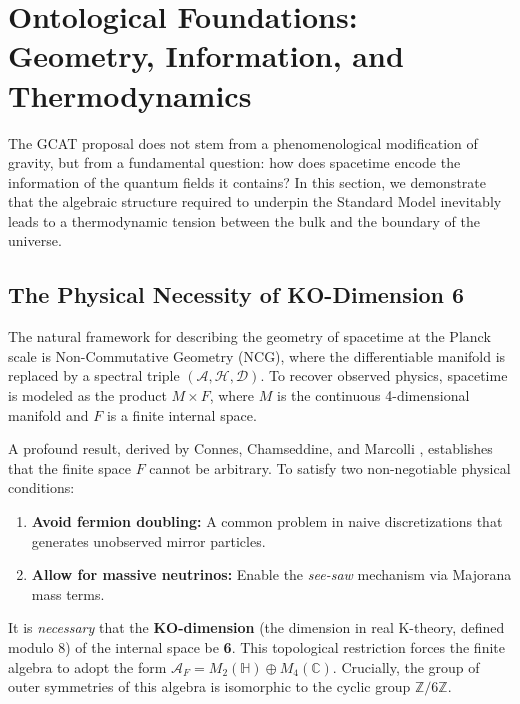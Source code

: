 \documentclass[12pt, a4paper]{article}
\theoremstyle{plain}
\theoremstyle{definition}
\begin{document}
\section{Ontological Foundations: Geometry, Information, and Thermodynamics}
\label{sec:foundations}

The GCAT proposal does not stem from a phenomenological modification of gravity, but from a fundamental question: how does spacetime encode the information of the quantum fields it contains? In this section, we demonstrate that the algebraic structure required to underpin the Standard Model inevitably leads to a thermodynamic tension between the bulk and the boundary of the universe.

\subsection{The Physical Necessity of KO-Dimension 6}

The natural framework for describing the geometry of spacetime at the Planck scale is Non-Commutative Geometry (NCG), where the differentiable manifold is replaced by a spectral triple $(\mathcal{A}, \mathcal{H}, \mathcal{D})$. To recover observed physics, spacetime is modeled as the product $M \times F$, where $M$ is the continuous 4-dimensional manifold and $F$ is a finite internal space.

A profound result, derived by Connes, Chamseddine, and Marcolli \cite{Connes2008, Chamseddine2012}, establishes that the finite space $F$ cannot be arbitrary. To satisfy two non-negotiable physical conditions:
\begin{enumerate}
    \item \textbf{Avoid fermion doubling:} A common problem in naive discretizations that generates unobserved mirror particles.
    \item \textbf{Allow for massive neutrinos:} Enable the \textit{see-saw} mechanism via Majorana mass terms.
\end{enumerate}

It is \textit{necessary} that the \textbf{KO-dimension} (the dimension in real K-theory, defined modulo 8) of the internal space be \textbf{6}. This topological restriction forces the finite algebra to adopt the form $\mathcal{A}_F = M_2(\mathbb{H}) \oplus M_4(\mathbb{C})$. Crucially, the group of outer symmetries of this algebra is isomorphic to the cyclic group $\mathbb{Z}/6\mathbb{Z}$.
\end{document}
